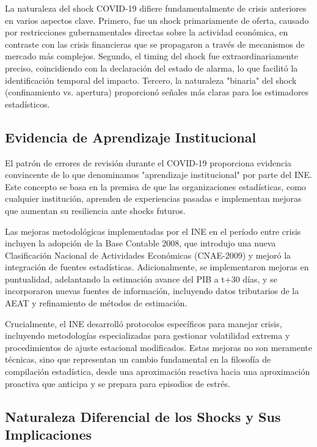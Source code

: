 \documentclass[12pt,a4paper]{article}
\begin{document}
La naturaleza del shock COVID-19 difiere fundamentalmente de crisis anteriores en varios aspectos clave. Primero, fue un shock primariamente de oferta, causado por restricciones gubernamentales directas sobre la actividad económica, en contraste con las crisis financieras que se propagaron a través de mecanismos de mercado más complejos. Segundo, el timing del shock fue extraordinariamente preciso, coincidiendo con la declaración del estado de alarma, lo que facilitó la identificación temporal del impacto. Tercero, la naturaleza "binaria" del shock (confinamiento vs. apertura) proporcionó señales más claras para los estimadores estadísticos.

\subsection{Evidencia de Aprendizaje Institucional}

El patrón de errores de revisión durante el COVID-19 proporciona evidencia convincente de lo que denominamos "aprendizaje institucional" por parte del INE. Este concepto se basa en la premisa de que las organizaciones estadísticas, como cualquier institución, aprenden de experiencias pasadas e implementan mejoras que aumentan su resiliencia ante shocks futuros.

Las mejoras metodológicas implementadas por el INE en el período entre crisis incluyen la adopción de la Base Contable 2008, que introdujo una nueva Clasificación Nacional de Actividades Económicas (CNAE-2009) y mejoró la integración de fuentes estadísticas. Adicionalmente, se implementaron mejoras en puntualidad, adelantando la estimación avance del PIB a t+30 días, y se incorporaron nuevas fuentes de información, incluyendo datos tributarios de la AEAT y refinamiento de métodos de estimación.

Crucialmente, el INE desarrolló protocolos específicos para manejar crisis, incluyendo metodologías especializadas para gestionar volatilidad extrema y procedimientos de ajuste estacional modificados. Estas mejoras no son meramente técnicas, sino que representan un cambio fundamental en la filosofía de compilación estadística, desde una aproximación reactiva hacia una aproximación proactiva que anticipa y se prepara para episodios de estrés.

\subsection{Naturaleza Diferencial de los Shocks y Sus Implicaciones}
\end{document}
